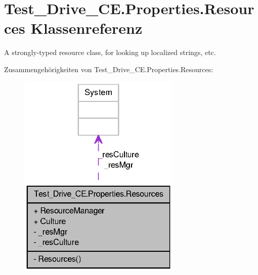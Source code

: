 \hypertarget{class_test___drive___c_e_1_1_properties_1_1_resources}{
\section{Test\_\-Drive\_\-CE.Properties.Resources Klassenreferenz}
\label{class_test___drive___c_e_1_1_properties_1_1_resources}
}


A strongly-\/typed resource class, for looking up localized strings, etc.  




Zusammengehörigkeiten von Test\_\-Drive\_\-CE.Properties.Resources:\nopagebreak
\begin{figure}[H]
\begin{center}
\leavevmode
\includegraphics[width=220pt]{class_test___drive___c_e_1_1_properties_1_1_resources__coll__graph}
\end{center}
\end{figure}
